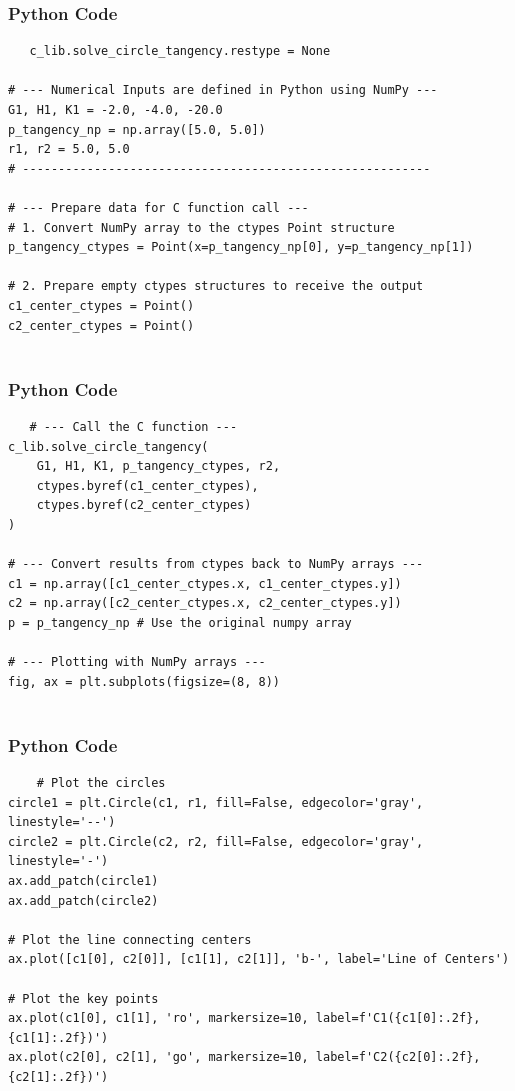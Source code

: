 \documentclass{beamer}
\begin{document}
    \begin{frame}[fragile]
        \frametitle{Python Code}
        \begin{lstlisting}
   c_lib.solve_circle_tangency.restype = None

# --- Numerical Inputs are defined in Python using NumPy ---
G1, H1, K1 = -2.0, -4.0, -20.0
p_tangency_np = np.array([5.0, 5.0])
r1, r2 = 5.0, 5.0
# ---------------------------------------------------------

# --- Prepare data for C function call ---
# 1. Convert NumPy array to the ctypes Point structure
p_tangency_ctypes = Point(x=p_tangency_np[0], y=p_tangency_np[1])

# 2. Prepare empty ctypes structures to receive the output
c1_center_ctypes = Point()
c2_center_ctypes = Point()


        \end{lstlisting}
    \end{frame}
    
    \begin{frame}[fragile]
        \frametitle{Python Code}
        \begin{lstlisting}
   # --- Call the C function ---
c_lib.solve_circle_tangency(
    G1, H1, K1, p_tangency_ctypes, r2, 
    ctypes.byref(c1_center_ctypes), 
    ctypes.byref(c2_center_ctypes)
)

# --- Convert results from ctypes back to NumPy arrays ---
c1 = np.array([c1_center_ctypes.x, c1_center_ctypes.y])
c2 = np.array([c2_center_ctypes.x, c2_center_ctypes.y])
p = p_tangency_np # Use the original numpy array

# --- Plotting with NumPy arrays ---
fig, ax = plt.subplots(figsize=(8, 8))


        \end{lstlisting}
    \end{frame}
    
    \begin{frame}[fragile]
        \frametitle{Python Code}
        \begin{lstlisting}
    # Plot the circles
circle1 = plt.Circle(c1, r1, fill=False, edgecolor='gray', linestyle='--')
circle2 = plt.Circle(c2, r2, fill=False, edgecolor='gray', linestyle='-')
ax.add_patch(circle1)
ax.add_patch(circle2)

# Plot the line connecting centers
ax.plot([c1[0], c2[0]], [c1[1], c2[1]], 'b-', label='Line of Centers')

# Plot the key points
ax.plot(c1[0], c1[1], 'ro', markersize=10, label=f'C1({c1[0]:.2f}, {c1[1]:.2f})')
ax.plot(c2[0], c2[1], 'go', markersize=10, label=f'C2({c2[0]:.2f}, {c2[1]:.2f})')

        \end{lstlisting}
    \end{frame}
\end{document}
